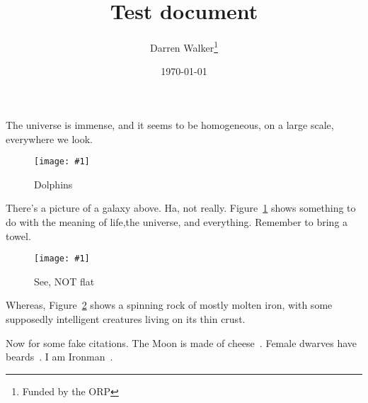 \documentclass{article}
\title{Test document}
\author{Darren Walker\thanks{Funded by the ORP}}
\date{\today}
\newcommand{\myfigures}[2]{%
    \begin{figure}[ht]
    \centering
    \texttt{[image: \#1]}
    \caption{#2}
    \label{fig:#1}
    \end{figure}
}
\begin{document}
    \maketitle
    The universe is immense, and it seems to be homogeneous,
    on a large scale, everywhere we look.

    \myfigures{hhg2g_dp}{Dolphins}

    There's a picture of a galaxy above.
    Ha, not really.
    Figure~\ref{fig:hhg2g_dp} shows something to do with the
    meaning of life,the universe, and everything.
    Remember to bring a towel.

    \myfigures{earth_profile}{See, NOT flat}

    Whereas, Figure~\ref{fig:earth_profile} shows a spinning rock of mostly
    molten iron, with some supposedly intelligent creatures living on its
    thin crust.

    Now for some fake citations.
    The Moon is made of cheese~\cite{fakearticle}.
    Female dwarves have beards~\cite{fakebook}.
    I am Ironman~\cite{fakeproceedings}.


    
    
\end{document}
